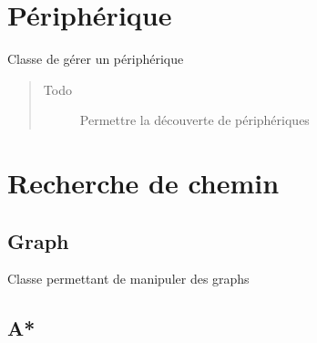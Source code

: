 \documentclass[letterpaper,10pt,french]{sphinxmanual}
\begin{document}
\chapter{Périphérique}
\label{peripherique:module-lib.peripherique}\label{peripherique::doc}\label{peripherique:peripherique}

\begin{fulllineitems}
\label{peripherique:lib.peripherique.Peripherique}
Classe de gérer un périphérique
\begin{quote}\begin{description}
\item[{Todo }] \leavevmode
Permettre la découverte de périphériques

\end{description}\end{quote}

\end{fulllineitems}



\chapter{Recherche de chemin}
\label{recherche_chemin::doc}\label{recherche_chemin:recherche-de-chemin}

\section{Graph}
\label{recherche_chemin:graph}\label{recherche_chemin:module-lib.recherche_chemin.graph}

\begin{fulllineitems}
\label{recherche_chemin:lib.recherche_chemin.graph.Graph}
Classe permettant de manipuler des graphs

\end{fulllineitems}



\section{A*}
\label{recherche_chemin:a}\label{recherche_chemin:module-lib.recherche_chemin.astar}
\end{document}
